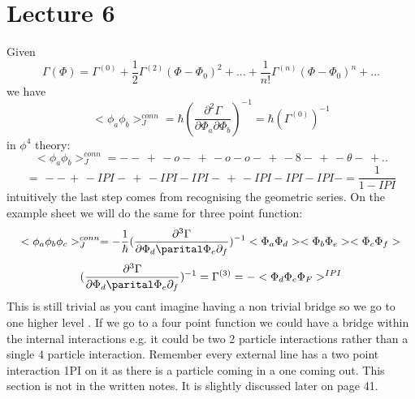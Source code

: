 \documentclass{article}
\begin{document}
\section{Lecture 6}
Given $$\Gamma(\Phi) = \Gamma^{(0)} + \frac{1}{2} \Gamma^{(2)}( \Phi - \Phi_0)^2 + ... + \frac{1}{n!} \Gamma^{(n)}(\Phi- \Phi_0)^n +...$$ we have
$$
< \phi_a \phi_b>_J^{conn} = \hbar( \frac{\partial^2 \Gamma}{\partial \Phi_a \partial \Phi_b})^{-1} = \hbar ( \Gamma^{(0)})^{-1}
$$
in $\phi^4$ theory:
$$
< \phi_a \phi_b>_J^{conn} = -- \,+\, -o- \,+\, -o-o- \,+\, -8- \,+ \,- \theta - \,+ ..
$$
$$=  \,--\, +\, -IPI- \,+ \,-IPI-IPI- \,+ \,-IPI-IPI-IPI- =  \frac{1}{1- IPI}
$$
intuitively the last step comes from recognising the geometric series. On the example sheet we will do the same for three point function:
$$
< \phi_a \phi_b \phi_c >_J^{conn} = - \frac{1}{\hbar} ( \frac{\partial^3 \Gamma}{\partial \Phi_d \parital \Phi_e \partial_f})^{-1} <\Phi_a \Phi_d> <\Phi_b \Phi_e> <\Phi_c \Phi_f> 
$$
$$
( \frac{\partial^3 \Gamma}{\partial \Phi_d \parital \Phi_e \partial_f})^{-1}  = \Gamma^{(3)} = - <\Phi_d \Phi_e \Phi_F> ^{IPI}
$$
This is still trivial as you cant imagine having a non trivial bridge so we go to one higher level . If we go to a four point function we could have a bridge within the internal interactions e.g. it could be two 2 particle interactions rather than a single 4 particle interaction. Remember every external line has a two point interaction 1PI on it as there is a particle coming in a one coming out. This section is not in the written notes. It is slightly discussed later on page 41.
\end{document}
